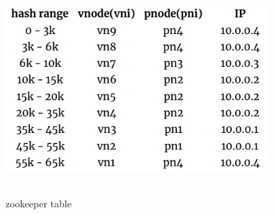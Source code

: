 \begin{figure}[h!]
  \centering
  \includegraphics[width=10cm,height=8cm,keepaspectratio]{../media/crawler/zookeeper_info.png}
  \caption{zookeeper table}
  \label{fig:zookeeper_info}
\end{figure}

\pagebreak
